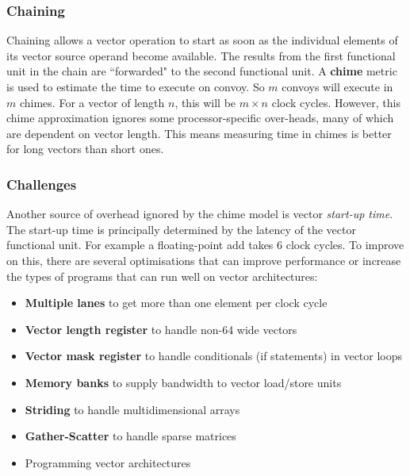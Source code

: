 \documentclass[11pt]{article}
\begin{document}
\subsubsection{Chaining}
Chaining allows a vector operation to start as soon as the individual elements of its vector source operand become available. The results from the first functional unit in the chain are ``forwarded" to the second functional unit. 
\n
A \textbf{chime} metric is used to estimate the time to execute on convoy. So $m$ convoys will execute in $m$ chimes. For a vector of length $n$, this will be $m \times n$ clock cycles. However, this chime approximation ignores some processor-specific over-heads, many of which are dependent on vector length. This means measuring time in chimes is better for long vectors than short ones. 

\subsubsection{Challenges}
Another source of overhead ignored by the chime model is vector \textit{start-up time}. The start-up time is principally determined by the latency of the vector functional unit. For example a floating-point add takes 6 clock cycles. 
\n
To improve on this, there are several optimisations that can improve performance or increase the types of programs that can run well on vector architectures:
\begin{itemize}
\item \textbf{Multiple lanes} to get more than one element per clock cycle
\item \textbf{Vector length register} to handle non-64 wide vectors
\item \textbf{Vector mask register} to handle conditionals (if statements) in vector loops
\item \textbf{Memory banks} to supply bandwidth to vector load/store units
\item \textbf{Striding} to handle multidimensional arrays
\item \textbf{Gather-Scatter} to handle sparse matrices
\item Programming vector architectures
\end{itemize}
\end{document}
